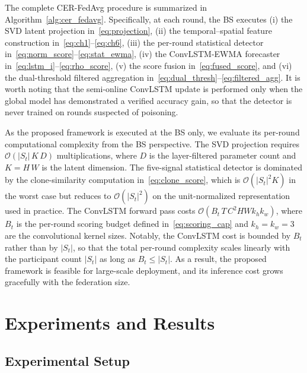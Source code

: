 \documentclass[journal]{IEEEtran}
\begin{document}
The complete CER-FedAvg procedure is summarized in Algorithm~\ref{alg:cer_fedavg}. Specifically, at each round, the BS executes (i) the SVD latent projection in~\eqref{eq:projection}, (ii) the temporal--spatial feature construction in~\eqref{eq:ch1}--\eqref{eq:ch6}, (iii) the per-round statistical detector in~\eqref{eq:norm_score}--\eqref{eq:stat_ewma}, (iv) the ConvLSTM-EWMA forecaster in~\eqref{eq:lstm_i}--\eqref{eq:rho_score}, (v) the score fusion in~\eqref{eq:fused_score}, and (vi) the dual-threshold filtered aggregation in~\eqref{eq:dual_thresh}--\eqref{eq:filtered_agg}. It is worth noting that the semi-online ConvLSTM update is performed only when the global model has demonstrated a verified accuracy gain, so that the detector is never trained on rounds suspected of poisoning.

As the proposed framework is executed at the BS only, we evaluate its per-round computational complexity from the BS perspective. The SVD projection requires $\mathcal{O}(|S_t|\,K\,D)$ multiplications, where $D$ is the layer-filtered parameter count and $K=H\,W$ is the latent dimension. The five-signal statistical detector is dominated by the clone-similarity computation in~\eqref{eq:clone_score}, which is $\mathcal{O}(|S_t|^2 K)$ in the worst case but reduces to $\mathcal{O}(|S_t|^2)$ on the unit-normalized representation used in practice. The ConvLSTM forward pass costs $\mathcal{O}(B_t\,T\,C^2 H W k_h k_w)$, where $B_t$ is the per-round scoring budget defined in~\eqref{eq:scoring_cap} and $k_h\!=\!k_w\!=\!3$ are the convolutional kernel sizes. Notably, the ConvLSTM cost is bounded by $B_t$ rather than by $|S_t|$, so that the total per-round complexity scales linearly with the participant count $|S_t|$ as long as $B_t \le |S_t|$. As a result, the proposed framework is feasible for large-scale deployment, and its inference cost grows gracefully with the federation size.

\section{Experiments and Results}
\label{sec:experiments}

\subsection{Experimental Setup}
\end{document}
